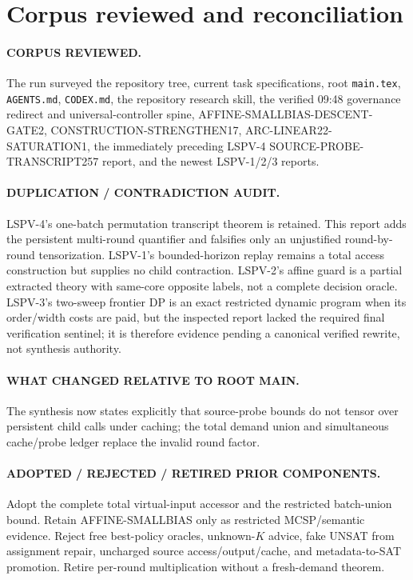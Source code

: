 \documentclass[11pt]{article}
\begin{document}
\section{Corpus reviewed and reconciliation}
\paragraph{CORPUS REVIEWED.}
The run surveyed the repository tree, current task specifications, root
\texttt{main.tex}, \texttt{AGENTS.md}, \texttt{CODEX.md}, the repository
research skill, the verified 09:48 governance redirect and universal-controller
spine, AFFINE-SMALLBIAS-DESCENT-GATE2, CONSTRUCTION-STRENGTHEN17,
ARC-LINEAR22-SATURATION1, the immediately preceding LSPV-4
SOURCE-PROBE-TRANSCRIPT257 report, and the newest LSPV-1/2/3 reports.

\paragraph{DUPLICATION / CONTRADICTION AUDIT.}
LSPV-4's one-batch permutation transcript theorem is retained.  This report adds
the persistent multi-round quantifier and falsifies only an unjustified
round-by-round tensorization.  LSPV-1's bounded-horizon replay remains a total
access construction but supplies no child contraction.  LSPV-2's affine guard
is a partial extracted theory with same-core opposite labels, not a complete
decision oracle.  LSPV-3's two-sweep frontier DP is an exact restricted dynamic
program when its order/width costs are paid, but the inspected report lacked the
required final verification sentinel; it is therefore evidence pending a
canonical verified rewrite, not synthesis authority.

\paragraph{WHAT CHANGED RELATIVE TO ROOT MAIN.}
The synthesis now states explicitly that source-probe bounds do not tensor over
persistent child calls under caching; the total demand union and simultaneous
cache/probe ledger replace the invalid round factor.

\paragraph{ADOPTED / REJECTED / RETIRED PRIOR COMPONENTS.}
Adopt the complete total virtual-input accessor and the restricted batch-union
bound.  Retain AFFINE-SMALLBIAS only as restricted MCSP/semantic evidence.
Reject free best-policy oracles, unknown-$K$ advice, fake UNSAT from assignment
repair, uncharged source access/output/cache, and metadata-to-SAT promotion.
Retire per-round multiplication without a fresh-demand theorem.
\end{document}
